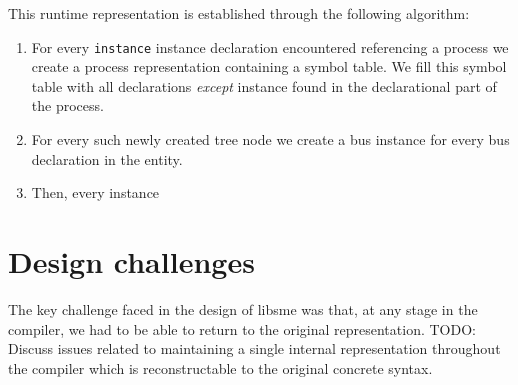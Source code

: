 This runtime representation is established through the following
algorithm:
\begin{enumerate}
  \item For every {\tt instance} instance declaration encountered referencing a
    process we create a process representation containing a symbol table. We
    fill this symbol table with all declarations {\itshape except} instance
    found in the declarational part of the process.
    
  \item For every such newly created tree node we create a bus instance for
    every bus declaration in the entity.
  \item Then, every instance 
\end{enumerate}

\section{Design challenges}
The key challenge faced in the design of libsme was that, at any stage in the
compiler, we had to be able to return to the original representation.
TODO: Discuss issues related to maintaining a single internal representation
throughout the compiler which is reconstructable to the original concrete
syntax.






